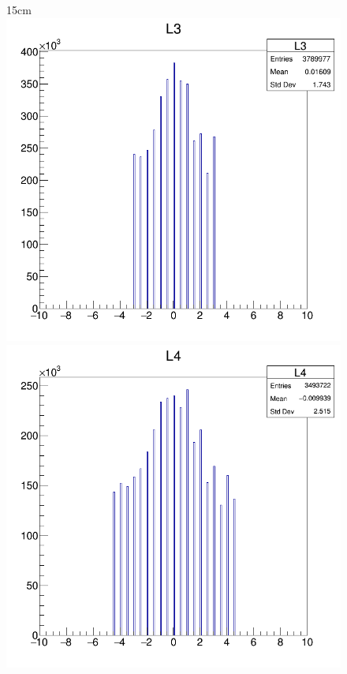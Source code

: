 \begin{figure}[htbp]{15cm}
	\includegraphics[scale=0.19]{AppendixCMSL1TT/figs/JetPt250_PU200_deltaS_l3}
	\includegraphics[scale=0.19]{AppendixCMSL1TT/figs/JetPt250_PU200_deltaS_l4}

\end{figure}
